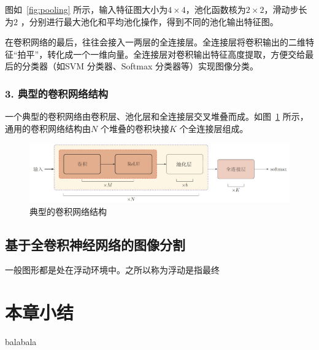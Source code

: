 图如~\ref{fig:pooling} 所示，输入特征图大小为$4 \times 4$，池化函数核为$2 \times 2$，滑动步长为$2$ ，分别进行最大池化和平均池化操作，得到不同的池化输出特征图。

在卷积网络的最后，往往会接入一两层的全连接层。全连接层将卷积输出的二维特征“拍平”，转化成一个一维向量。全连接层对卷积输出特征高度提取，方便交给最后的分类器（如SVM 分类器、Softmax 分类器等）实现图像分类。

\subsubsection*{3. 典型的卷积网络结构}
\label{subsec:chap02-2-1-3}
一个典型的卷积网络由卷积层、池化层和全连接层交叉堆叠而成。如图~\ref{fig:cnn_structure} 所示，通用的卷积网络结构由$N$ 个堆叠的卷积块接$K$ 个全连接层组成。

\begin{figure}[htbp]
  \centering
  \includegraphics[width=1.0\textwidth]{figures/cnn_structure}
  \caption{典型的卷积网络结构}\label{fig:cnn_structure}
\end{figure}

\subsection{基于全卷积神经网络的图像分割}
\label{subsec:chap02-2-1}
一般图形都是处在浮动环境中。之所以称为浮动是指最终


\section{本章小结}
\label{sec:chap02-3}
balabala